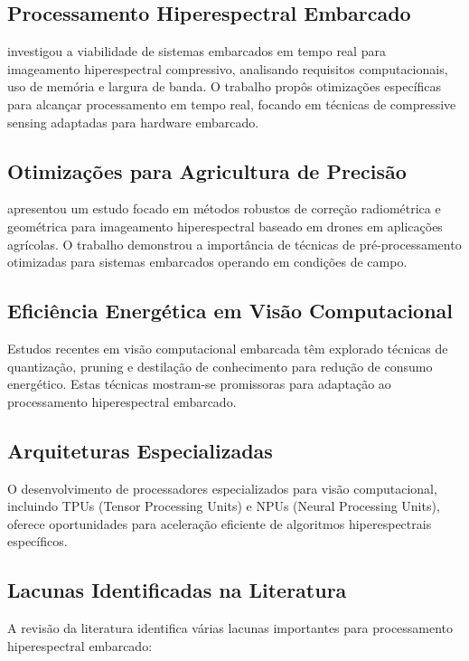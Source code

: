 \subsection{Processamento Hiperespectral Embarcado}
\cite{Lim2022} investigou a viabilidade de sistemas embarcados em tempo real para imageamento hiperespectral compressivo, analisando requisitos computacionais, uso de memória e largura de banda. O trabalho propôs otimizações específicas para alcançar processamento em tempo real, focando em técnicas de compressive sensing adaptadas para hardware embarcado.

\subsection{Otimizações para Agricultura de Precisão}
\cite{Shin2024} apresentou um estudo focado em métodos robustos de correção radiométrica e geométrica para imageamento hiperespectral baseado em drones em aplicações agrícolas. O trabalho demonstrou a importância de técnicas de pré-processamento otimizadas para sistemas embarcados operando em condições de campo.

\subsection{Eficiência Energética em Visão Computacional}
Estudos recentes em visão computacional embarcada têm explorado técnicas de quantização, pruning e destilação de conhecimento para redução de consumo energético. Estas técnicas mostram-se promissoras para adaptação ao processamento hiperespectral embarcado.

\subsection{Arquiteturas Especializadas}
O desenvolvimento de processadores especializados para visão computacional, incluindo TPUs (Tensor Processing Units) e NPUs (Neural Processing Units), oferece oportunidades para aceleração eficiente de algoritmos hiperespectrais específicos.

\subsection{Lacunas Identificadas na Literatura}
A revisão da literatura identifica várias lacunas importantes para processamento hiperespectral embarcado:

